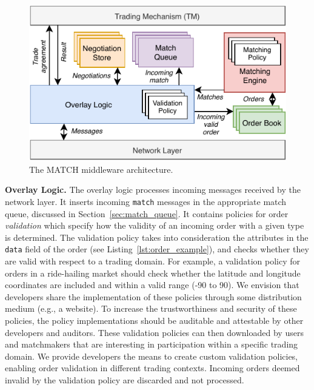 \begin{figure}[t]
	\centering
	\includegraphics[width=.9\linewidth]{match/assets/matching_architecture}
	\caption{The MATCH middleware architecture.}
	\label{fig:matching_architecture}
\end{figure}

\textbf{Overlay Logic.}
The overlay logic processes incoming messages received by the network layer. %
It inserts incoming \texttt{match} messages in the appropriate match queue, discussed in Section~\ref{sec:match_queue}.
It contains policies for order \emph{validation} which specify how the validity of an incoming order with a given type is determined.
The validation policy takes into consideration the attributes in the \texttt{data} field of the order (see Listing~\ref{lst:order_example}), and checks whether they are valid with respect to a trading domain.
For example, a validation policy for orders in a ride-hailing market should check whether the latitude and longitude coordinates are included and within a valid range (-90 to 90).
We envision that developers share the implementation of these policies through some distribution medium (e.g., a website).
To increase the trustworthiness and security of these policies, the policy implementations should be auditable and attestable by other developers and auditors.
These validation policies can then downloaded by users and matchmakers that are interesting in participation within a specific trading domain.
We provide developers the means to create custom validation policies, enabling order validation in different trading contexts.
Incoming orders deemed invalid by the validation policy are discarded and not processed.


